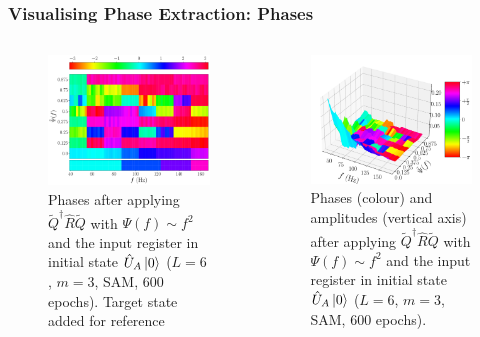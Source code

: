 \documentclass{beamer}
\begin{document}
\begin{frame}
\frametitle{Visualising Phase Extraction: Phases}
\begin{columns}
\begin{column}{0.5\textwidth}
\begin{figure}
\centering 
\includegraphics[width=\textwidth]{im/QRQ_phase_quadratic_UA}
\caption{Phases after applying $\tilde{Q}^\dagger\hat{R}\tilde{Q}$ with $\Psi(f) \sim f^2$ and the input register in initial state $\hat{U}_A \ket{0}$ ($L=6$, $m=3$, SAM, 600 epochs). Target state added for reference}
\end{figure}
\end{column}
\begin{column}{0.5\textwidth}
\begin{figure}
\centering 
\includegraphics[width=\textwidth]{im/QRQ_3D_quadratic_UA}
\caption{Phases (colour) and amplitudes (vertical axis) after applying $\tilde{Q}^\dagger \hat{R}\tilde{Q}$ with $\Psi(f) \sim f^2$ and the input register in initial state $\hat{U}_A \ket{0}$ ($L=6$, $m=3$, SAM, 600 epochs).}
\end{figure}
\end{column}
\end{columns}
\end{frame}
\end{document}
